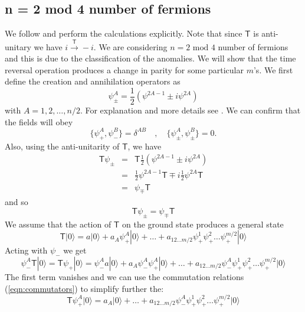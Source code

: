\documentclass[12pt,a4paper]{article}
\begin{document}
\subsection{n = 2 mod 4 number of fermions}
We follow \cite{Delmastro2021} and perform the calculations explicitly.  Note that since $ \mathsf{T} $ is anti-unitary we have $i \xrightarrow{\mathsf{T}} -i$. We are considering $ n = 2 \text{ mod } 4 $ number of fermions and this is due to the classification of the anomalies. We will show that the time reversal operation produces a change in parity for some particular $ m $'s.
We first define the creation and annihilation operators as
\begin{equation}
	\psi _{ \pm } ^A = \frac{ 1 }{ 2 } \left( \psi ^{ 2A-1 } \pm i \psi ^{ 2A }  \right) 
\end{equation}
with $ A = 1,2,\dots,n/2 $. For explanation and more details see \cite{Traubenberg2009}. We can confirm that the fields will obey
\begin{equation}
	\{ \psi _+ ^A, \psi _-^B\} = \delta ^{ AB } \quad,\quad \{ \psi ^A _{ \pm } , \psi ^B _{ \pm } \} =0.
	\label{eqn:commutators}
\end{equation}
Also, using the anti-unitarity of $ \mathsf{T} $, we have
\begin{eqnarray*}
	\mathsf{T} \psi _{ \pm } &=& \mathsf{T} \frac{ 1 }{ 2 } \left( \psi ^{ 2A-1 } \pm i \psi ^{ 2A } \right) \\
	&=& \frac{ 1 }{ 2 } \psi ^{ 2A-1 } \mathsf{T} \mp i\frac{ 1 }{ 2 }  \psi ^{ 2A } \mathsf{T}\\
	&=& \psi _{ \mp } \mathsf{T}
\end{eqnarray*}
and so
\begin{equation}
	\mathsf{T} \psi _{ \pm } = \psi _{ \mp } \mathsf{T}
	\label{eqn:tcreation}
\end{equation}
We assume that the action of $ \mathsf{T} $ on the ground state produces a general state
\begin{equation}
	\mathsf{T} | 0 \rangle = a | 0 \rangle + a_A \psi _+ ^{A} | 0 \rangle + \dots + a _{ 12\dots m/2 } \psi _+^1 \psi _+^2\dots \psi_+^{ m/2 } | 0 \rangle
	\label{eqn:tstate}
\end{equation}
Acting with $ \psi_- $ we get
\begin{equation}
	\psi _- ^A \mathsf{T} | 0 \rangle = \mathsf{T} \psi _+ | 0 \rangle = \psi _-^A a | 0 \rangle +a_A \psi _-^A \psi _+^A | 0 \rangle + \dots + a _{ 12\dots m/2 } \psi _-^A \psi _+^1 \psi _+^2 \dots \psi _+ ^{ m/2 } | 0 \rangle
	\label{eqn:psit}
\end{equation}
The first term vanishes and we can use the commutation relations (\ref{eqn:commutators}) to simplify further the:
\begin{equation*}
	\mathsf{T} \psi_+ ^A | 0 \rangle = a_A | 0 \rangle + \dots + a _{ 12\dots m/2 } \psi_- ^A \psi_+ ^1 \psi_+^2 \dots \psi_+ ^{ m/2 } | 0 \rangle 
\end{equation*}
\end{document}
